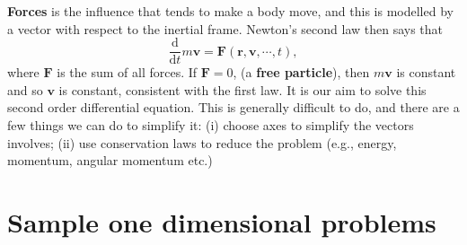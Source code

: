 \documentclass[letter-paper]{tufte-book}
\newcommand{\Fb}{\boldsymbol{F}}
\newcommand{\rb}{\boldsymbol{r}}
\newcommand{\vb}{\boldsymbol{v}}
\newcommand\Def[1]{\textbf{#1}}
\begin{document}
\Def{Forces} is the influence that tends to make a body move, and this is
modelled by a vector with respect to the inertial frame. Newton's second law
then says that
\begin{equation*}
  \frac{\mathrm{d}}{\mathrm{d}t} m\vb = \Fb(\rb, \vb, \cdots, t),
\end{equation*}
where $\Fb$ is the sum of all forces. If $\Fb = 0$, (a \Def{free
particle}), then $m\vb$ is constant and so $\vb$ is constant, consistent with
the first law. It is our aim to solve this second order differential equation.
This is generally difficult to do, and there are a few things we can do to
simplify it: (i) choose axes to simplify the vectors involves; (ii) use
conservation laws to reduce the problem (e.g., energy, momentum, angular
momentum etc.)


\section{Sample one dimensional problems}
\end{document}
